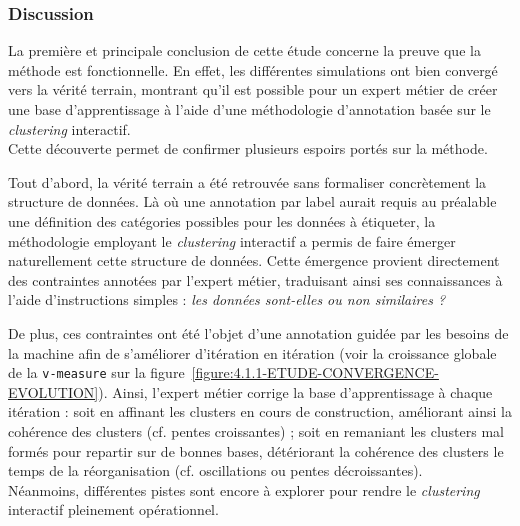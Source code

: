 			\subsubsection{Discussion}
				
				La première et principale conclusion de cette étude concerne la preuve que la méthode est fonctionnelle.
				En effet, les différentes simulations ont bien convergé vers la vérité terrain, montrant qu'il est possible pour un expert métier de créer une base d'apprentissage à l'aide d'une méthodologie d'annotation basée sur le \textit{clustering} interactif. \\
				
				
				Cette découverte permet de confirmer plusieurs espoirs portés sur la méthode. 
				
				Tout d'abord, la vérité terrain a été retrouvée sans formaliser concrètement la structure de données.
				Là où une annotation par label aurait requis au préalable une définition des catégories possibles pour les données à étiqueter, la méthodologie employant le \textit{clustering} interactif a permis de faire émerger naturellement cette structure de données.
				Cette émergence provient directement des contraintes annotées par l'expert métier, traduisant ainsi ses connaissances à l'aide d'instructions simples : \textit{les données sont-elles ou non similaires ?}
				
				De plus, ces contraintes ont été l'objet d'une annotation guidée par les besoins de la machine afin de s'améliorer d'itération en itération (voir la croissance globale de la \texttt{v-measure} sur la figure~\ref{figure:4.1.1-ETUDE-CONVERGENCE-EVOLUTION}).
				Ainsi, l'expert métier corrige la base d'apprentissage à chaque itération : soit en affinant les clusters en cours de construction, améliorant ainsi la cohérence des clusters (cf. pentes croissantes) ; soit en remaniant les clusters mal formés pour repartir sur de bonnes bases, détériorant la cohérence des clusters le temps de la réorganisation (cf. oscillations ou pentes décroissantes). \\

				
				Néanmoins, différentes pistes sont encore à explorer pour rendre le \textit{clustering} interactif pleinement opérationnel.
				
